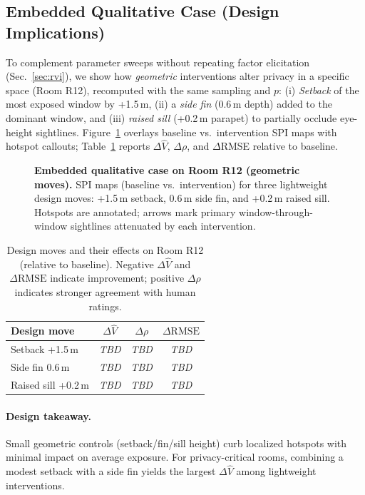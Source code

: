 \documentclass[final,3p,times,review]{elsarticle}
\begin{document}
\subsection{Embedded Qualitative Case (Design Implications)}
To complement parameter sweeps without repeating factor elicitation (Sec.~\ref{sec:rvi}), we show how \emph{geometric} interventions alter privacy in a specific space (Room R12), recomputed with the same sampling and $p$:
(i) \emph{Setback} of the most exposed window by +1.5\,m,
(ii) a \emph{side fin} (0.6\,m depth) added to the dominant window, and
(iii) \emph{raised sill} (+0.2\,m parapet) to partially occlude eye-height sightlines.
Figure~\ref{fig:sensitivity-case} overlays baseline vs.\ intervention SPI maps with hotspot callouts; Table~\ref{tab:case_deltas} reports $\Delta\widehat{V}$, $\Delta\rho$, and $\Delta$RMSE relative to baseline.

\begin{figure}[t]
  \centering
  \caption{\textbf{Embedded qualitative case on Room R12 (geometric moves).} SPI maps (baseline vs.\ intervention) for three lightweight design moves: +1.5\,m setback, 0.6\,m side fin, and +0.2\,m raised sill. Hotspots are annotated; arrows mark primary window-through-window sightlines attenuated by each intervention.}
  \label{fig:sensitivity-case}
\end{figure}

\begin{table}[H]
\centering
\caption{Design moves and their effects on Room R12 (relative to baseline). Negative $\Delta\widehat{V}$ and $\Delta\text{RMSE}$ indicate improvement; positive $\Delta\rho$ indicates stronger agreement with human ratings.}
\label{tab:case_deltas}
\setlength{\tabcolsep}{6pt}
\renewcommand{\arraystretch}{1.15}
\begin{tabular}{@{}lccc@{}}
\toprule
Design move & $\Delta\widehat{V}$ & $\Delta\rho$ & $\Delta\text{RMSE}$ \\
\midrule
Setback +1.5\,m & \textit{TBD} & \textit{TBD} & \textit{TBD} \\
Side fin 0.6\,m & \textit{TBD} & \textit{TBD} & \textit{TBD} \\
Raised sill +0.2\,m & \textit{TBD} & \textit{TBD} & \textit{TBD} \\
\bottomrule
\end{tabular}
\end{table}

\paragraph{Design takeaway.}
Small geometric controls (setback/fin/sill height) curb localized hotspots with minimal impact on average exposure. For privacy-critical rooms, combining a modest setback with a side fin yields the largest $\Delta\widehat{V}$ among lightweight interventions.
\end{document}
